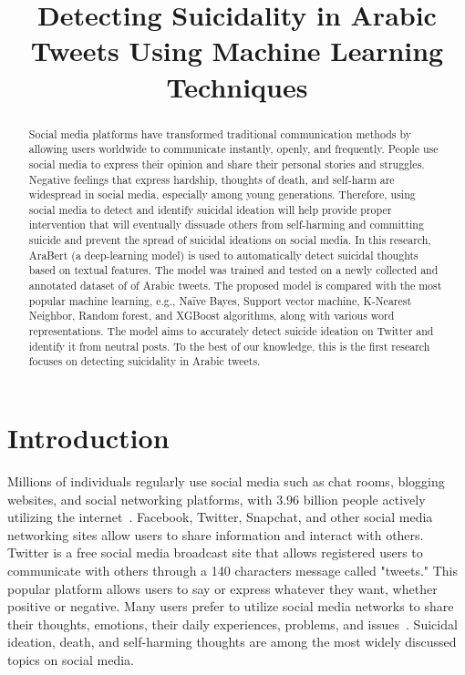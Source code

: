 \documentclass[11pt]{article}
\title{Detecting Suicidality in Arabic Tweets Using Machine Learning Techniques}
\begin{document}
\maketitle

\begin{abstract}
Social media platforms have transformed traditional communication methods by allowing users worldwide to communicate instantly, openly, and frequently. People use social media to express their opinion and share their personal stories and struggles. Negative feelings that express hardship, thoughts of death, and self-harm are widespread in social media, especially among young generations. Therefore, using social media to detect and identify suicidal ideation will help provide proper intervention that will eventually dissuade others from self-harming and committing suicide and prevent the spread of suicidal ideations on social media. In this research,  AraBert (a deep-learning model) is used to automatically detect suicidal thoughts based on textual features. The model was trained and tested on a newly collected and annotated dataset of of Arabic tweets. The proposed model is compared with the most popular machine learning, e.g., Naïve Bayes, Support vector machine, K-Nearest Neighbor, Random forest, and  XGBoost algorithms, along with various word representations. 
The model aims to accurately detect suicide ideation on Twitter and identify it from neutral posts. To the best of our knowledge, this is the first research focuses on detecting suicidality in Arabic tweets.
\end{abstract}



\section{Introduction}
Millions of individuals regularly use social media such as chat rooms, blogging websites, and social networking platforms, with $3.96$ billion people actively utilizing the internet~\cite{1astoveza2018suicidal}. Facebook, Twitter, Snapchat, and other social media networking sites allow users to share information and interact with others. Twitter is a free social media broadcast site that allows registered users to communicate with others through a 140 characters message called "tweets." This popular platform allows users to say or express whatever they want, whether positive or negative. Many users prefer to utilize social media networks to share their thoughts, emotions, their daily experiences, problems, and issues~\cite{15n10.1145/2858036.2858207}. Suicidal ideation, death, and self-harming thoughts are among the most widely discussed topics on social media.
\end{document}
